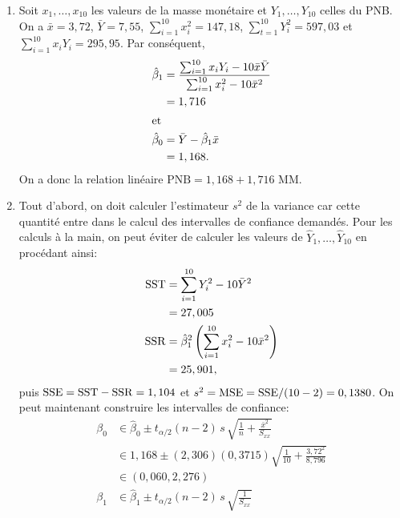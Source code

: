\begin{solution}{2.16}
    \begin{enumerate}
    \item Soit $x_1, \dots, x_{10}$ les valeurs de la masse monétaire
      et $Y_1, \dots, Y_{10}$ celles du PNB. On a $\bar{x} = 3,72$,
      $\bar{Y} = 7,55$, $\sum_{i = 1}^{10} x_i^2 = 147,18$, $\sum_{t =
        1}^{10} Y_i^2 = 597,03$ et $\sum_{i = 1}^{10} x_i Y_i =
      295,95$. Par conséquent,
      \begin{align*}
        \hat{\beta}_1
        &= \frac{\sum_{i=1}^{10} x_i Y_i - 10 \bar{x} \bar{Y}}{%
          \sum_{i=1}^{10} x_i^2 - 10 \bar{x}^2} \\
        &= 1,716 \\
        \intertext{et}
        \hat{\beta}_0
        &= \bar{Y} - \hat{\beta}_1 \bar{x} \\
        &= 1,168.
      \end{align*}
      On a donc la relation linéaire $\text{PNB} = 1,168 + 1,716
      \text{ MM}$.
    \item Tout d'abord, on doit calculer l'estimateur $s^2$ de la
      variance car cette quantité entre dans le calcul des intervalles
      de confiance demandés. Pour les calculs à la main, on peut
      éviter de calculer les valeurs de $\hat{Y}_1, \dots,
      \hat{Y}_{10}$ en procédant ainsi:
      \begin{align*}
        \mathrm{SST}
        &= \sum_{i=1}^{10} Y_i^2 - 10 \bar{Y}^2 \\
        &= 27,005 \\
        \mathrm{SSR}
        &= \hat{\beta}_1^2
        \left(
          \sum_{i=1}^{10} x_i^2 - 10 \bar{x}^2
        \right) \\
        &= 25,901,
      \end{align*}
      puis $\mathrm{SSE} = \mathrm{SST} - \mathrm{SSR} = 1,104$ et $s^2 = \mathrm{MSE} = \mathrm{SSE}/(10 - 2)
      = 0,1380$.  On peut maintenant construire les intervalles de
      confiance:
      \begin{align*}
        \beta_0
        &\in \hat{\beta}_0 \pm t_{\alpha/2}(n - 2)\, s\,
        \sqrt{\frac{1}{n} + \frac{\bar{x}^2}{S_{xx}}} \\
        &\in 1,168 \pm (2,306) (0,3715)
        \sqrt{\frac{1}{10} + \frac{3,72^2}{8,796}} \\
        &\in (0,060, 2,276) \\
        \beta_1
        &\in \hat{\beta}_1 \pm t_{\alpha/2}(n - 2)\, s\,
        \sqrt{\frac{1}{S_{xx}}} \\

\end{align*}
\end{enumerate}
\end{solution}

